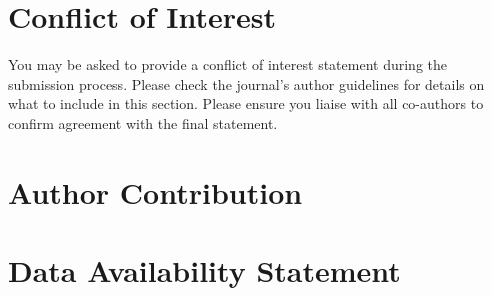 \documentclass[alpha-refs]{wiley-article}
\begin{document}
\section*{Conflict of Interest}
You may be asked to provide a conflict of interest statement during the submission process. Please check the journal's author guidelines for details on what to include in this section. Please ensure you liaise with all co-authors to confirm agreement with the final statement.

\section*{Author Contribution}

\section*{Data Availability Statement}

\printendnotes



\end{document}
